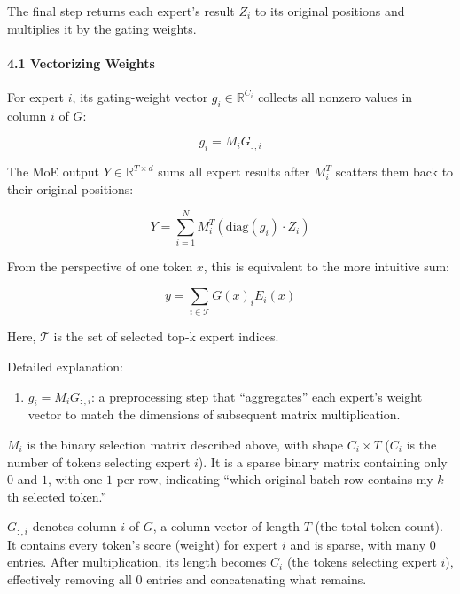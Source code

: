 The final step returns each expert's result \(Z_i\) to its original positions and multiplies it by the gating weights.

\hypertarget{vectorizing-weights}{%
\paragraph{4.1 Vectorizing Weights}\label{vectorizing-weights}}

For expert \(i\), its gating-weight vector \(g_i \in \mathbb{R}^{C_i}\) collects all nonzero values in column \(i\) of \(G\):

\[
g_i = M_iG_{:,i}
\]

The MoE output \(Y \in \mathbb{R}^{T \times d}\) sums all expert results after \(M_i^T\) scatters them back to their original positions:

\[
Y = \sum_{i=1}^{N} M_i^T(\mathrm{diag}(g_i) \cdot Z_i)
\]

From the perspective of one token \(x\), this is equivalent to the more intuitive sum:

\[
y = \sum_{i \in \mathcal{T}} G(x)_iE_i(x)
\]

Here, \(\mathcal{T}\) is the set of selected top-k expert indices.

Detailed explanation:

\begin{enumerate}
\def\labelenumi{\arabic{enumi}.}
\tightlist
\item
  \(g_i=M_iG_{:,i}\): a preprocessing step that ``aggregates'' each expert's weight vector to match the dimensions of subsequent matrix multiplication.
\end{enumerate}

\(M_i\) is the binary selection matrix described above, with shape \(C_i\times T\) (\(C_i\) is the number of tokens selecting expert \(i\)). It is a sparse binary matrix containing only \(0\) and \(1\), with one \(1\) per row, indicating ``which original batch row contains my \(k\)-th selected token.''

\(G_{:,i}\) denotes column \(i\) of \(G\), a column vector of length \(T\) (the total token count). It contains every token's score (weight) for expert \(i\) and is sparse, with many \(0\) entries. After multiplication, its length becomes \(C_i\) (the tokens selecting expert \(i\)), effectively removing all \(0\) entries and concatenating what remains.

